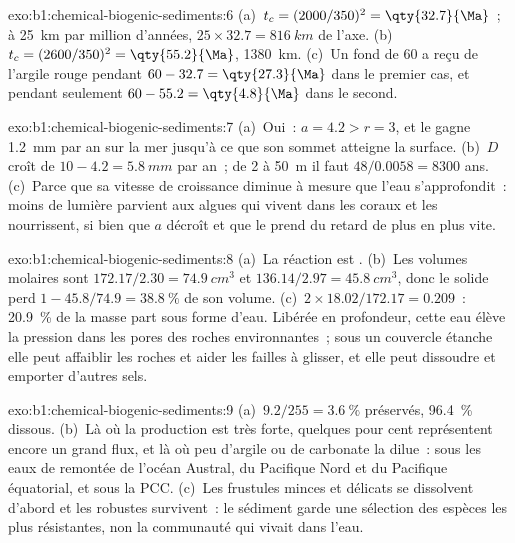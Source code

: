 \begin{solution}{exo:b1:chemical-biogenic-sediments:6}
(a)~$t_c = (2000/350)^2 = \qty{32.7}{\Ma}$~; à \qty{25}{km} par million d'années,
$25\times32.7 = \qty{816}{km}$ de l'axe. (b)~$t_c = (2600/350)^2 =
\qty{55.2}{\Ma}$, \qty{1380}{km}. (c)~Un fond de \qty{60}{\Ma} a reçu de l'argile
rouge pendant $60 - 32.7 = \qty{27.3}{\Ma}$ dans le premier cas, et pendant seulement
$60 - 55.2 = \qty{4.8}{\Ma}$ dans le second.
\end{solution}

\begin{solution}{exo:b1:chemical-biogenic-sediments:7}
(a)~Oui~: $a = 4.2 > r = 3$, et le  gagne \qty{1.2}{mm} par an sur la mer
jusqu'à ce que son sommet atteigne la surface. (b)~$D$ croît de $10 - 4.2 = \qty{5.8}{mm}$ par
an~; de 2 à \qty{50}{m} il faut $48/0.0058 = \num{8300}$ ans. (c)~Parce que
sa vitesse de croissance diminue à mesure que l'eau s'approfondit~: moins de lumière parvient aux algues qui
vivent dans les coraux et les nourrissent, si bien que $a$ décroît et que le  prend du retard
de plus en plus vite.
\end{solution}

\begin{solution}{exo:b1:chemical-biogenic-sediments:8}
(a)~La réaction est . (b)~Les volumes molaires sont $172.17/2.30 =
\qty{74.9}{cm^3}$ et $136.14/2.97 = \qty{45.8}{cm^3}$, donc le solide perd
$1 - 45.8/74.9 = \qty{38.8}{\%}$ de son volume. (c)~$2\times18.02/172.17 = 0.209$~:
\qty{20.9}{\%} de la masse part sous forme d'eau. Libérée en profondeur, cette eau
élève la pression dans les pores des roches environnantes~; sous un couvercle étanche elle peut affaiblir
les roches et aider les failles à glisser, et elle peut dissoudre et emporter d'autres
sels.
\end{solution}

\begin{solution}{exo:b1:chemical-biogenic-sediments:9}
(a)~$9.2/255 = \qty{3.6}{\%}$ préservés, \qty{96.4}{\%} dissous. (b)~Là où
la production est très forte, quelques pour cent représentent encore un grand flux, et là où
peu d'argile ou de carbonate la dilue~: sous les eaux de remontée de l'océan Austral,
du Pacifique Nord et du Pacifique équatorial, et sous la PCC.
(c)~Les frustules minces et délicats se dissolvent d'abord et les robustes survivent~: le
sédiment garde une sélection des espèces les plus résistantes, non la communauté qui
vivait dans l'eau.
\end{solution}


